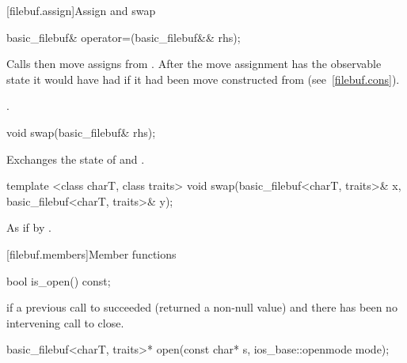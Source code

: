 [filebuf.assign]{Assign and swap}

%
%
\begin{itemdecl}
basic_filebuf& operator=(basic_filebuf&& rhs);
\end{itemdecl}

\begin{itemdescr}
\pnum
\effects Calls  then move assigns from . After the
move assignment  has the observable state it would have had if it
had been move constructed from  (see~\ref{filebuf.cons}).

\pnum
\returns {}.
\end{itemdescr}

%
%
\begin{itemdecl}
void swap(basic_filebuf& rhs);
\end{itemdecl}

\begin{itemdescr}
\pnum
\effects Exchanges the state of 
and .
\end{itemdescr}

%
%
\begin{itemdecl}
template <class charT, class traits>
  void swap(basic_filebuf<charT, traits>& x,
            basic_filebuf<charT, traits>& y);
\end{itemdecl}

\begin{itemdescr}
\pnum
\effects As if by .
\end{itemdescr}

[filebuf.members]{Member functions}

%
\begin{itemdecl}
bool is_open() const;
\end{itemdecl}

\begin{itemdescr}
\pnum
\returns
{}
if a previous call to
succeeded (returned a non-null value) and there has been no intervening
call to close.
\end{itemdescr}

%
\begin{itemdecl}
basic_filebuf<charT, traits>* open(const char* s,
                                   ios_base::openmode mode);
\end{itemdecl}

